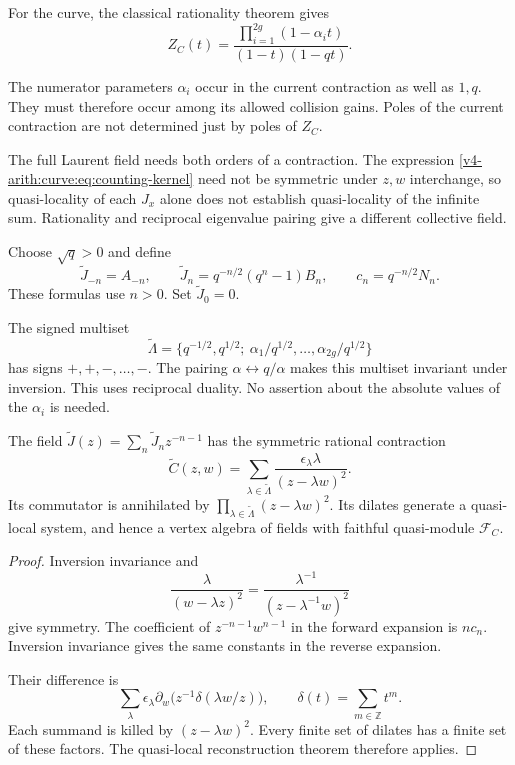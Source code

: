 For the curve, the classical rationality theorem gives
\[
 Z_C(t)=\frac{\prod_{i=1}^{2g}(1-\alpha_it)}{(1-t)(1-qt)}.
\]

The numerator parameters $\alpha_i$ occur in the current
contraction as well as $1,q$. They must therefore occur among
its allowed collision gains. Poles of the current contraction
are not determined just by poles of $Z_C$.

The full Laurent field needs both orders of a contraction.
The expression \eqref{v4-arith:curve:eq:counting-kernel} need not
be symmetric under $z,w$ interchange, so quasi-locality of each
$J_x$ alone does not establish quasi-locality of the infinite sum.
Rationality and reciprocal eigenvalue pairing give a different
collective field.

Choose $\sqrt q>0$ and define
\[
 \widetilde J_{-n}=A_{-n},\qquad
 \widetilde J_n=q^{-n/2}(q^n-1)B_n,\qquad
 c_n=q^{-n/2}N_n.
\]
These formulas use $n>0$. Set $\widetilde J_0=0$.

The signed multiset
\[
 \widetilde\Lambda
   =\{q^{-1/2},q^{1/2};\ \alpha_1/q^{1/2},\ldots,\alpha_{2g}/q^{1/2}\}
\]
has signs $+,+,-,\ldots,-$. The pairing
$\alpha\leftrightarrow q/\alpha$ makes this multiset invariant
under inversion. This uses reciprocal duality. No assertion about
the absolute values of the $\alpha_i$ is needed.

\begin{theorem}\label{v4-arith:curve:thm:reciprocal}
The field $\widetilde J(z)=\sum_n\widetilde J_nz^{-n-1}$
has the symmetric rational contraction
\[
 \widetilde C(z,w)=
 \sum_{\lambda\in\widetilde\Lambda}
       \frac{\epsilon_\lambda\lambda}{(z-\lambda w)^2}.
\]
Its commutator is annihilated by
$\prod_{\lambda\in\widetilde\Lambda}(z-\lambda w)^2$.
Its dilates generate a quasi-local system, and hence a vertex
algebra of fields with faithful quasi-module $\mathcal F_C$.
\end{theorem}
\begin{proof}
Inversion invariance and
\[
 \frac{\lambda}{(w-\lambda z)^2}
 =\frac{\lambda^{-1}}{(z-\lambda^{-1}w)^2}
\]
give symmetry. The coefficient of
$z^{-n-1}w^{n-1}$ in the forward expansion is $nc_n$.
Inversion invariance gives the same constants in the reverse
expansion.

Their difference is
\[
 \sum_{\lambda}\epsilon_\lambda\partial_w
       \bigl(z^{-1}\delta(\lambda w/z)\bigr),
 \qquad \delta(t)=\sum_{m\in\mathbb Z}t^m.
\]
Each summand is killed by $(z-\lambda w)^2$.
Every finite set of dilates has a finite set of these factors.
The quasi-local reconstruction theorem therefore applies.
\end{proof}

